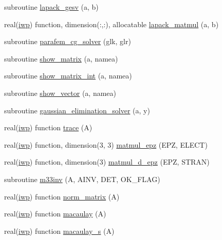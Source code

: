 \begin{DoxyCompactItemize}
\item 
subroutine \hyperlink{classlinearsolvers_abb3bbd495b91e60987fd259d527c86d9}{lapack\+\_\+gesv} (a, b)
\item 
real(\hyperlink{classlinearsolvers_ae428ee060e10bb0c2b1ce969c90536e1}{iwp}) function, dimension(\+:,\+:), allocatable \hyperlink{classlinearsolvers_ad88688443e91d5d28f951581a8c38384}{lapack\+\_\+matmul} (a, b)
\item 
subroutine \hyperlink{classlinearsolvers_a04cdb69bb1885c29b8a2e98bc520e0b5}{parafem\+\_\+cg\+\_\+solver} (glk, glr)
\item 
subroutine \hyperlink{classlinearsolvers_a10c18bc1fcc00fcb3e7dcbc588100e0c}{show\+\_\+matrix} (a, namea)
\item 
subroutine \hyperlink{classlinearsolvers_a089ce52faf0b0a449fa2a1a10eadcb04}{show\+\_\+matrix\+\_\+int} (a, namea)
\item 
subroutine \hyperlink{classlinearsolvers_a81b496b53eb2c889419050c03dac2f16}{show\+\_\+vector} (a, namea)
\item 
subroutine \hyperlink{classlinearsolvers_a173276a5b88d374a1cdbe7a1b6847e63}{gaussian\+\_\+elimination\+\_\+solver} (a, y)
\item 
real(\hyperlink{classlinearsolvers_ae428ee060e10bb0c2b1ce969c90536e1}{iwp}) function \hyperlink{classlinearsolvers_ad87c12c315b04b68b2ee828684718de5}{trace} (A)
\item 
real(\hyperlink{classlinearsolvers_ae428ee060e10bb0c2b1ce969c90536e1}{iwp}) function, dimension(3, 3) \hyperlink{classlinearsolvers_aaf2872d914fd7140684b3089079db9de}{matmul\+\_\+epz} (E\+P\+Z, E\+L\+E\+C\+T)
\item 
real(\hyperlink{classlinearsolvers_ae428ee060e10bb0c2b1ce969c90536e1}{iwp}) function, dimension(3) \hyperlink{classlinearsolvers_a4138a879bf5f5d3e350f59fe845104d5}{matmul\+\_\+d\+\_\+epz} (E\+P\+Z, S\+T\+R\+A\+N)
\item 
subroutine \hyperlink{classlinearsolvers_a627510b88326df29f5e7fa1458b5bb8f}{m33inv} (A, A\+I\+N\+V, D\+E\+T, O\+K\+\_\+\+F\+L\+A\+G)
\item 
real(\hyperlink{classlinearsolvers_ae428ee060e10bb0c2b1ce969c90536e1}{iwp}) function \hyperlink{classlinearsolvers_a186e6def623a0a5ec9926817c1e933da}{norm\+\_\+matrix} (A)
\item 
real(\hyperlink{classlinearsolvers_ae428ee060e10bb0c2b1ce969c90536e1}{iwp}) function \hyperlink{classlinearsolvers_ab00f1964cedbc21b51f8e52b3811166e}{macaulay} (A)
\item 
real(\hyperlink{classlinearsolvers_ae428ee060e10bb0c2b1ce969c90536e1}{iwp}) function \hyperlink{classlinearsolvers_a93bb8b24318c10821db3f773a4cf8f7f}{macaulay\+\_\+s} (A)

\end{DoxyCompactItemize}
